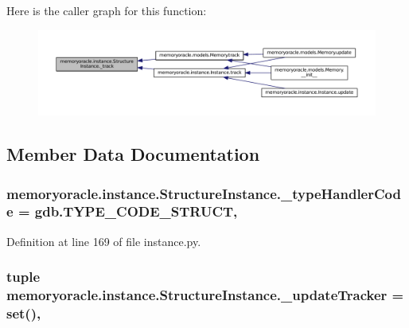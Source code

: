 Here is the caller graph for this function\+:
\nopagebreak
\begin{figure}[H]
\begin{center}
\leavevmode
\includegraphics[width=350pt]{classmemoryoracle_1_1instance_1_1StructureInstance_a972b88ba2dcdc0e5d362d92e740f446d_icgraph}
\end{center}
\end{figure}




\subsection{Member Data Documentation}
\hypertarget{classmemoryoracle_1_1instance_1_1StructureInstance_a51072a5a6d2932e6f06581d1c0356eee}{}
\subsubsection[{\+\_\+type\+Handler\+Code}]{\setlength{\rightskip}{0pt plus 5cm}memoryoracle.\+instance.\+Structure\+Instance.\+\_\+type\+Handler\+Code = gdb.\+T\+Y\+P\+E\+\_\+\+C\+O\+D\+E\+\_\+\+S\+T\+R\+U\+C\+T\hspace{0.3cm}{\ttfamily [static]}, {\ttfamily [private]}}\label{classmemoryoracle_1_1instance_1_1StructureInstance_a51072a5a6d2932e6f06581d1c0356eee}


Definition at line 169 of file instance.\+py.

\hypertarget{classmemoryoracle_1_1instance_1_1StructureInstance_a022600b9e3e0ff85fdc84d76730a3e85}{}
\subsubsection[{\+\_\+update\+Tracker}]{\setlength{\rightskip}{0pt plus 5cm}tuple memoryoracle.\+instance.\+Structure\+Instance.\+\_\+update\+Tracker = set()\hspace{0.3cm}{\ttfamily [static]}, {\ttfamily [private]}}\label{classmemoryoracle_1_1instance_1_1StructureInstance_a022600b9e3e0ff85fdc84d76730a3e85}



